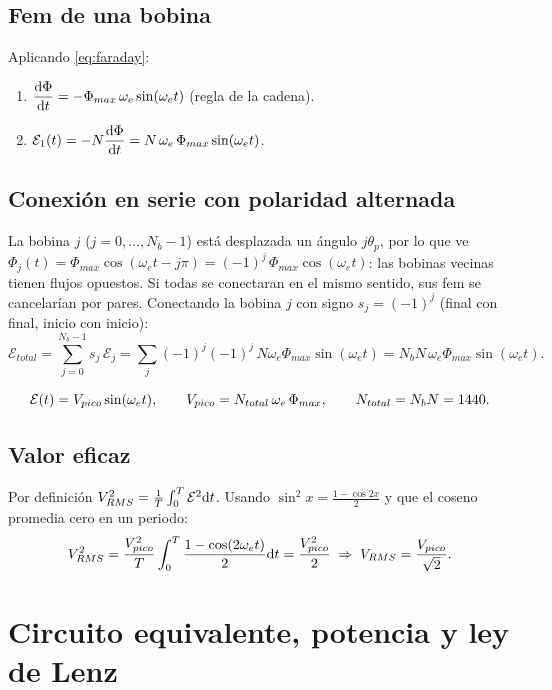 \documentclass[11pt]{article}
\begin{document}
\subsection{Fem de una bobina}
Aplicando \eqref{eq:faraday}:
\begin{enumerate}
  \item $\dfrac{\mathrm{d}\Phi}{\mathrm{d} t}=-\Phi_{max}\,\omega_e\sin(\omega_e t)$ (regla de la cadena).
  \item $\mathcal{E}_1(t)=-N\dfrac{\mathrm{d}\Phi}{\mathrm{d} t}=N\,\omega_e\,\Phi_{max}\sin(\omega_e t)$.
\end{enumerate}

\subsection{Conexión en serie con polaridad alternada}
La bobina $j$ ($j=0,\dots,N_b-1$) está desplazada un ángulo $j\theta_p$, por lo que ve
$\Phi_j(t)=\Phi_{max}\cos(\omega_e t-j\pi)=(-1)^j\,\Phi_{max}\cos(\omega_e t)$: las bobinas vecinas tienen flujos
opuestos. Si todas se conectaran en el mismo sentido, sus fem se cancelarían por pares. Conectando la bobina $j$
con signo $s_j=(-1)^j$ (final con final, inicio con inicio):
\[
  \mathcal{E}_{total}=\sum_{j=0}^{N_b-1}s_j\,\mathcal{E}_j=\sum_{j}(-1)^j(-1)^j\,N\omega_e\Phi_{max}\sin(\omega_e t)
  =N_b N\,\omega_e\Phi_{max}\sin(\omega_e t).
\]
\begin{resultado}
\begin{equation}
  \mathcal{E}(t)=V_{pico}\sin(\omega_e t),\qquad V_{pico}=N_{total}\,\omega_e\,\Phi_{max},\qquad N_{total}=N_bN=1440 .
  \label{eq:fem}
\end{equation}
\end{resultado}

\subsection{Valor eficaz}
Por definición $V_{RMS}^2=\frac1T\int_0^T\mathcal{E}^2\mathrm{d} t$. Usando $\sin^2x=\frac{1-\cos2x}{2}$ y que el coseno
promedia cero en un periodo:
\begin{equation}
  V_{RMS}^2=\frac{V_{pico}^2}{T}\int_0^T\frac{1-\cos(2\omega_e t)}{2}\mathrm{d} t=\frac{V_{pico}^2}{2}
  \;\Rightarrow\; V_{RMS}=\frac{V_{pico}}{\sqrt2}.
\end{equation}

\section{Circuito equivalente, potencia y ley de Lenz}
\end{document}
